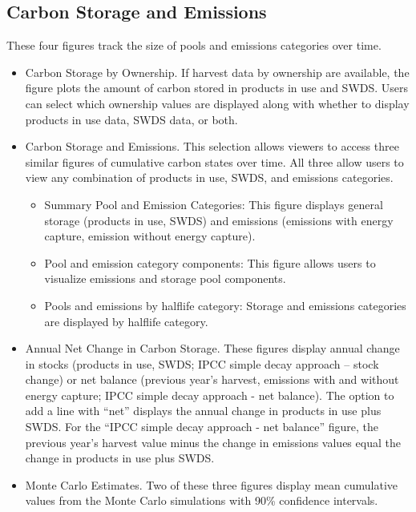 \documentclass[
]{book}
\providecommand{\tightlist}{%
  \setlength{\itemsep}{0pt}\setlength{\parskip}{0pt}}
\begin{document}
\hypertarget{run-shiny-cse}{%
\subsection{Carbon Storage and Emissions}\label{run-shiny-cse}}

These four figures track the size of pools and emissions categories over time.

\begin{itemize}
\item
  Carbon Storage by Ownership. If harvest data by ownership are available, the figure plots the amount of carbon stored in products in use and SWDS. Users can select which ownership values are displayed along with whether to display products in use data, SWDS data, or both.\\
\item
  Carbon Storage and Emissions. This selection allows viewers to access three similar figures of cumulative carbon states over time. All three allow users to view any combination of products in use, SWDS, and emissions categories.

  \begin{itemize}
  \tightlist
  \item
    Summary Pool and Emission Categories: This figure displays general storage (products in use, SWDS) and emissions (emissions with energy capture, emission without energy capture).
  \item
    Pool and emission category components: This figure allows users to visualize emissions and storage pool components.
  \item
    Pools and emissions by halflife category: Storage and emissions categories are displayed by halflife category.\\
  \end{itemize}
\item
  Annual Net Change in Carbon Storage. These figures display annual change in stocks (products in use, SWDS; IPCC simple decay approach -- stock change) or net balance (previous year's harvest, emissions with and without energy capture; IPCC simple decay approach - net balance). The option to add a line with ``net'' displays the annual change in products in use plus SWDS. For the ``IPCC simple decay approach - net balance'' figure, the previous year's harvest value minus the change in emissions values equal the change in products in use plus SWDS.
\item
  Monte Carlo Estimates. Two of these three figures display mean cumulative values from the Monte Carlo simulations with 90\% confidence intervals.


\end{itemize}
\end{document}
